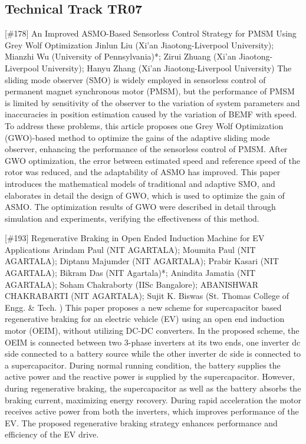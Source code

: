 \clearpage \subsection{Technical Track TR07}\nopagebreak {} \begin{abstract_online} {[\#178] An Improved ASMO-Based Sensorless Control Strategy for PMSM Using Grey Wolf Optimization} {} {Jinlun Liu (Xi'an Jiaotong-Liverpool University); Mianzhi Wu (University of Pennsylvania)*; Zirui Zhuang (Xi'an Jiaotong-Liverpool University); Hanyu Zhang (Xi'an Jiaotong-Liverpool University)} {} The sliding mode observer (SMO) is widely employed in sensorless control of permanent magnet synchronous motor (PMSM), but the performance of PMSM is limited by sensitivity of the observer to the variation of system parameters and inaccuracies in position estimation caused by the variation of BEMF with speed. To address these problems, this article proposes one Grey Wolf Optimization (GWO)-based method to optimize the gains of the adaptive sliding mode observer, enhancing the performance of the sensorless control of PMSM. After GWO optimization, the error between estimated speed and reference speed of the rotor was reduced, and the adaptability of ASMO has improved. This paper introduces the mathematical models of traditional and adaptive SMO, and elaborates in detail the design of GWO, which is used to optimize the gain of ASMO. The optimization results of GWO were described in detail through simulation and experiments, verifying the effectiveness of this method.  \end{abstract_online} 
{} \begin{abstract_online} {[\#193] Regenerative Braking in Open Ended Induction Machine for EV Applications} {} {Arindam Paul (NIT AGARTALA); Moumita Paul (NIT AGARTALA); Diptanu Majumder (NIT AGARTALA); Prabir Kasari (NIT AGARTALA); Bikram Das (NIT Agartala)*; Anindita Jamatia (NIT AGARTALA); Soham Chakraborty (IISc Bangalore); ABANISHWAR CHAKRABARTI (NIT AGARTALA); Sujit K. Biswas (St. Thomas College of Engg. \& Tech. )} {} This paper proposes a new scheme for supercapacitor based regenerative braking for an electric vehicle (EV) using an open end induction motor (OEIM), without utilizing DC-DC converters. In the proposed scheme, the OEIM is connected between two 3-phase inverters at its two ends, one inverter dc side connected to a battery source while the other inverter dc side is connected to a supercapacitor. During normal running condition, the battery supplies the active power and the reactive power is supplied by the supercapacitor. However, during regenerative braking, the supercapacitor as well as the battery absorbs the braking current, maximizing energy recovery. During rapid acceleration the motor receives active power from both the inverters, which improves performance of the EV. The proposed regenerative braking strategy enhances performance and efficiency of the EV drive. \end{abstract_online} 
